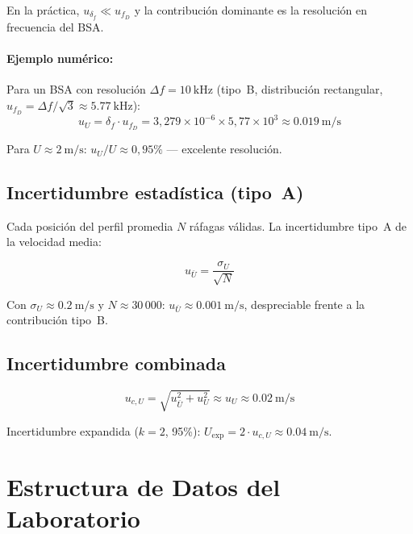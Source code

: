 \documentclass[12pt,a4paper]{article}
\begin{document}
En la práctica, $u_{\delta_f} \ll u_{f_D}$ y la contribución dominante es la
resolución en frecuencia del BSA.

\paragraph{Ejemplo numérico:}
Para un BSA con resolución $\Delta f = \SI{10}{\kHz}$ (tipo~B,
distribución rectangular, $u_{f_D} = \Delta f / \sqrt{3}
	\approx \SI{5,77}{\kHz}$):
\begin{equation}
	u_U = \delta_f \cdot u_{f_D}
		= 3{,}279\times10^{-6}\times 5{,}77\times10^{3}
	\approx \SI{0,019}{\m\per\s}
	\label{eq:uU_num}
\end{equation}

Para $U \approx \SI{2}{\m\per\s}$: $u_U/U \approx 0{,}95\%$
--- excelente resolución.

\subsection{Incertidumbre estadística (tipo~A)}

Cada posición del perfil promedia $N$ ráfagas válidas.  La incertidumbre
tipo~A de la velocidad media:

\begin{equation}
	u_{\bar{U}} = \frac{\sigma_U}{\sqrt{N}}
	\label{eq:uA_mean}
\end{equation}

Con $\sigma_U \approx \SI{0,2}{\m\per\s}$ y $N \approx 30\,000$:
$u_{\bar{U}} \approx \SI{0,001}{\m\per\s}$, despreciable frente a la
contribución tipo~B.

\subsection{Incertidumbre combinada}

\begin{equation}
	u_{c,U} = \sqrt{u_{\bar{U}}^2 + u_U^2}
	\approx u_U \approx \SI{0,02}{\m\per\s}
	\label{eq:uc_U}
\end{equation}

Incertidumbre expandida ($k = 2$, 95\%):
$U_\mathrm{exp} = 2 \cdot u_{c,U} \approx \SI{0,04}{\m\per\s}$.

\section{Estructura de Datos del Laboratorio}
\label{sec:datos}
\end{document}
